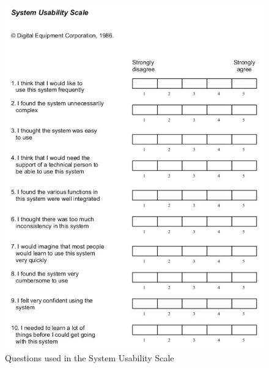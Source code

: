 \documentclass[a4paper,12pt]{kth-mag}
\begin{document}
\begin{figure}[ht]
	\centering
	\includegraphics[keepaspectratio, scale = 0.7]{images/sus_quest2.png}
	\caption{\small{Questions used in the System Usability Scale}}\label{Quest}
\end{figure}
\end{document}
